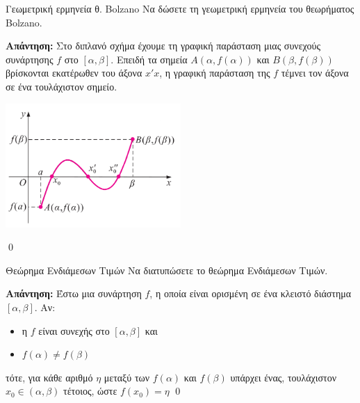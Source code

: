 \documentclass[a4paper, 12pt]{article}
\renewenvironment{proof}[1][\textbf{Απάντηση}]{%
  \par\noindent\textbf{#1:} \rmfamily}{\qed\par}
\begin{document}
\begin{theorem}{Γεωμετρική ερμηνεία θ. Bolzano }
  Να δώσετε τη γεωμετρική ερμηνεία του θεωρήματος Bolzano.
\end{theorem}
\begin{proof}
  Στο διπλανό σχήμα έχουμε τη γραφική παράσταση μιας συνεχούς συνάρτησης $f$ στο $[α, β]$. Επειδή τα σημεία $Α(α, f(α))$ και $Β(β, f(β))$ βρίσκονται εκατέρωθεν του άξονα $x′x$, η γραφική παράσταση της $f$ τέμνει τον άξονα σε ένα τουλάχιστον σημείο.
  \begin{center}
    \includegraphics[width=0.5\textwidth]{images/geoBolzano}
  \end{center}
\end{proof}

\begin{theorem}{Θεώρημα Ενδιάμεσων Τιμών}
  Να διατυπώσετε το θεώρημα Ενδιάμεσων Τιμών.
\end{theorem}
\begin{proof}
  Έστω μια συνάρτηση $f$, η οποία είναι ορισμένη σε ένα κλειστό διάστημα $[α, β]$. Αν:
  \begin{itemize}
    \item η $f$ είναι συνεχής στο $[α, β]$ και
    \item $f(α) \neq f(β)$
  \end{itemize}
  τότε, για κάθε αριθμό $η$ μεταξύ των $f(α)$ και $f(β)$ υπάρχει ένας, τουλάχιστον
  $x_0 \in (α , β )$ τέτοιος, ώστε
  $f(x_0) = η$
\end{proof}
\end{document}
